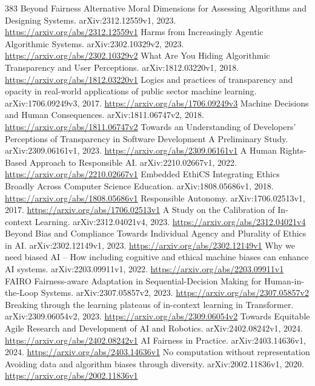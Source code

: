 \documentclass[11pt]{article}
\begin{document}
\begin{thebibliography}{383}
 Beyond Fairness Alternative Moral Dimensions for Assessing Algorithms and Designing Systems. arXiv:2312.12559v1, 2023. \url{https://arxiv.org/abs/2312.12559v1}
 Harms from Increasingly Agentic Algorithmic Systems. arXiv:2302.10329v2, 2023. \url{https://arxiv.org/abs/2302.10329v2}
 What Are You Hiding Algorithmic Transparency and User Perceptions. arXiv:1812.03220v1, 2018. \url{https://arxiv.org/abs/1812.03220v1}
 Logics and practices of transparency and opacity in real-world applications of public sector machine learning. arXiv:1706.09249v3, 2017. \url{https://arxiv.org/abs/1706.09249v3}
 Machine Decisions and Human Consequences. arXiv:1811.06747v2, 2018. \url{https://arxiv.org/abs/1811.06747v2}
 Towards an Understanding of Developers' Perceptions of Transparency in Software Development A Preliminary Study. arXiv:2309.06161v1, 2023. \url{https://arxiv.org/abs/2309.06161v1}
 A Human Rights-Based Approach to Responsible AI. arXiv:2210.02667v1, 2022. \url{https://arxiv.org/abs/2210.02667v1}
 Embedded EthiCS Integrating Ethics Broadly Across Computer Science Education. arXiv:1808.05686v1, 2018. \url{https://arxiv.org/abs/1808.05686v1}
 Responsible Autonomy. arXiv:1706.02513v1, 2017. \url{https://arxiv.org/abs/1706.02513v1}
 A Study on the Calibration of In-context Learning. arXiv:2312.04021v4, 2023. \url{https://arxiv.org/abs/2312.04021v4}
 Beyond Bias and Compliance Towards Individual Agency and Plurality of Ethics in AI. arXiv:2302.12149v1, 2023. \url{https://arxiv.org/abs/2302.12149v1}
 Why we need biased AI -- How including cognitive and ethical machine biases can enhance AI systems. arXiv:2203.09911v1, 2022. \url{https://arxiv.org/abs/2203.09911v1}
 FAIRO Fairness-aware Adaptation in Sequential-Decision Making for Human-in-the-Loop Systems. arXiv:2307.05857v2, 2023. \url{https://arxiv.org/abs/2307.05857v2}
 Breaking through the learning plateaus of in-context learning in Transformer. arXiv:2309.06054v2, 2023. \url{https://arxiv.org/abs/2309.06054v2}
 Towards Equitable Agile Research and Development of AI and Robotics. arXiv:2402.08242v1, 2024. \url{https://arxiv.org/abs/2402.08242v1}
 AI Fairness in Practice. arXiv:2403.14636v1, 2024. \url{https://arxiv.org/abs/2403.14636v1}
 No computation without representation Avoiding data and algorithm biases through diversity. arXiv:2002.11836v1, 2020. \url{https://arxiv.org/abs/2002.11836v1}

\end{thebibliography}
\end{document}
